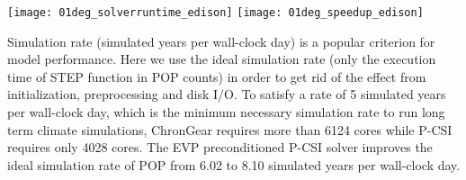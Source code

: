 \begin {figure*}[t!]
\begin{center}
\texttt{[image: 01deg\_solverruntime\_edison]}
\hspace{10pt}
\texttt{[image: 01deg\_speedup\_edison]}
\end{center}
\caption []{Execution time of barotropic solvers in the 0.1\degree POP for one day on Edison (left). 
The relative speedup of the whole POP model referred to the original configuration with a diagonal preconditioned ChronGear solver on 470 cores on Edison (right).\label {fig:runtime01_edison}}
\end {figure*}

Simulation rate (simulated years per wall-clock day) is a popular criterion for model performance. Here we use the ideal simulation rate (only the execution time of STEP function in POP counts) in order to get rid of the effect from initialization, preprocessing  and disk I/O. To satisfy a rate of 5 simulated years per wall-clock day, which is the minimum necessary simulation rate to run long term climate simulations, ChronGear requires more than 6124 cores while P-CSI requires only 4028 cores. 
The EVP preconditioned P-CSI solver improves the ideal simulation rate of POP from 6.02 to 8.10 simulated years per wall-clock day. 

